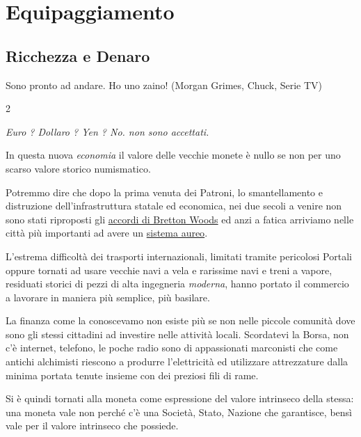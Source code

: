 \section{Equipaggiamento}\hypertarget{equipaggiamento}{}\label{equipaggiamento}

\subsection{Ricchezza e Denaro}
\begin{enfasi}{\begin{center}Sono pronto ad andare. Ho uno zaino! (Morgan Grimes, Chuck, Serie TV)\end{center}
}\end{enfasi}

\begin{multicols}{2}

\label{ricchezza-e-denaro}

\textit{Euro ? Dollaro ? Yen ? No. non sono accettati.}

In questa nuova \emph{economia} il valore delle vecchie monete è nullo se non per uno scarso valore storico numismatico.

Potremmo dire che dopo la prima venuta dei Patroni, lo smantellamento e distruzione dell'infrastruttura statale ed economica, nei due secoli a venire non sono stati riproposti gli \href{https://it.wikipedia.org/wiki/Accordi_di_Bretton_Woods}{accordi di Bretton Woods} ed anzi a fatica arriviamo nelle città più importanti ad avere un \href{https://it.wikipedia.org/wiki/Sistema_aureo}{sistema aureo}.

L'estrema difficoltà dei trasporti internazionali, limitati tramite pericolosi Portali oppure tornati ad usare vecchie navi a vela e rarissime navi e treni a vapore, residuati storici di pezzi di alta ingegneria \emph{moderna}, hanno portato il commercio a lavorare in maniera più semplice, più basilare.

La finanza come la conoscevamo non esiste più se non nelle piccole comunità dove sono gli stessi cittadini ad investire nelle attività locali. Scordatevi la Borsa, non c'è internet, telefono, le poche radio sono di appassionati marconisti che come antichi alchimisti riescono a produrre l'elettricità ed utilizzare attrezzature dalla minima portata tenute insieme con dei preziosi fili di rame.

Si è quindi tornati alla moneta come espressione del valore intrinseco della stessa: una moneta vale non perché c'è una Società, Stato, Nazione che garantisce, bensì vale per il valore intrinseco che possiede.


\end{multicols}
